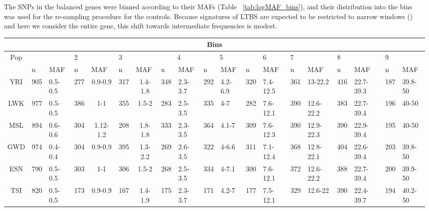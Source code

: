 \begin{refsection}
\begin{otherlanguage}{english}
The SNPs in the balanced genes were binned according to their MAFs (Table ~\ref{tab:logMAF_bins}), and their distribution into the bins was used for the re-sampling procedure for the controls. Because signatures of LTBS are expected to be restricted to narrow windows (\cite{Andres2009,Andres2011,Bitarello2016,Charlesworth2006}) and here we consider the entire gene, this shift towards intermediate frequencies is modest.

\begin{table}
\centering
\scriptsize
\begin{tabular}{@{}ccllclcllllllllllll@{}}
\toprule
\multicolumn{19}{c}{Bins} \\ \midrule
\rowcolor[HTML]{C0C0C0} 
{\color[HTML]{000000} Pop} & \multicolumn{2}{c}{\cellcolor[HTML]{C0C0C0}{\color[HTML]{000000} 1}} & \multicolumn{2}{l}{\cellcolor[HTML]{C0C0C0}2} & \multicolumn{2}{l}{\cellcolor[HTML]{C0C0C0}3} & \multicolumn{2}{c}{\cellcolor[HTML]{C0C0C0}4} & \multicolumn{2}{c}{\cellcolor[HTML]{C0C0C0}5} & \multicolumn{2}{c}{\cellcolor[HTML]{C0C0C0}6} & \multicolumn{2}{l}{\cellcolor[HTML]{C0C0C0}7} & \multicolumn{2}{l}{\cellcolor[HTML]{C0C0C0}8} & \multicolumn{2}{l}{\cellcolor[HTML]{C0C0C0}9} \\ \cmidrule(r){1-19} 
\multicolumn{1}{l}{} & \multicolumn{1}{l}{n} & MAF & n & \multicolumn{1}{l}{MAF} & n & \multicolumn{1}{l}{MAF} & n & MAF & n & MAF & n & MAF & n & MAF & n & MAF & n & MAF \\ \cmidrule(r){2-19}
YRI & 905 & 0.5-0.5 & 277 & 0.9-0.9 & 317 & 1.4-1.8 & 348 & 2.3-3.7 & 292 & 4.2-6.9 & 320 & 7.4-12.5 & 361 & 13-22.2 & 416 &  22.7- 39.3 & 187 & 39.8-50 \\
LWK & 977 & 0.5-0.5 & 386 & 1-1 & 355 & 1.5-2 & 283 & 2.5-3.5 & 335 & 4-7 & 282 & 7.6-12.1 & 390 & 12.6-22.2 & 383 & 22.7-39.4 & 196 & 40-50 \\
MSL & 894 & 0.6-0.6 & 304 & 1.12-1.2 & 208 & 1.8-1.8 & 333 & 2.3-3.5 & 364 & 4.1-7 & 309 & 7.6-12.3 & 390 & 12.9-22.3 & 390 & 22.9-39.4 & 195 & 40-50 \\
GWD & 974 & 0.4-0.4 & 304 & 0.9-0.9 & 395 & 1.3-2.2 & 269 & 2.6-3.5  & 322 & 4-6.6 & 311 & 7.1-12.4 & 368 & 12.8-22.1 & 404 & 22.6-39.4 & 203 & 39.8-50 \\
ESN & 790 & 0.5-0.5 & 303 & 1-1 & 306 & 1.5-2 & 268 & 2.5-3.5 & 334 & 4-7.1 & 300 & 7.6-12.1 & 372 & 12.6-22.2 & 388 & 22.7-39.4 & 200 & 39.9-50 \\
TSI & 820 & 0.5-0.5 & 173 & 0.9-0.9 & 167 & 1.4-1.9 & 175 & 2.3-3.7 & 171 & 4.2-7 & 177 & 7.5-12.1 & 329 & 12.6-22 & 390 & 22.4-39.7 & 194 & 40.2-50 \\

\end{tabular}
\end{table}
\end{otherlanguage}
\end{refsection}
